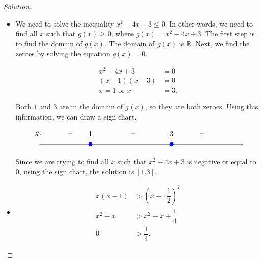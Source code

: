 \documentclass[12pt]{article}
\newenvironment{solution}{\begin{proof}[Solution]}{\end{proof}}
\begin{document}
\begin{enumerate}
\begin{solution}
\begin{itemize}
				The solution is $\left[\dfrac{1}{2},\infty\right]$.
				\item[(c)] 	We need to solve the inequality $x^2-4x+3\leq 0$. In other words, we need to find all $x$ such that $g(x) \geq 0$, where $g(x)=x^2-4x+3$. The first step is to find the domain of $g(x)$. The domain of $g(x)$ is $\mathbb{R}$. Next, we find the zeroes by solving the equation $g(x)=0$.
				
				\begin{align*}
					x^2-4x+3&=0\\
					(x-1)(x-3)&=0\\
					x=1 \text{ or } x&=3.
				\end{align*}
				
				Both $1$ and $3$ are in the domain of $g(x)$, so they are both zeroes. Using this information, we can draw a sign chart. 
				
				\[
				\begin{tikzpicture}[scale=1]
					\draw[->] (-5,0) -- (5,0);
					
					\draw (-2.5,0) node[circle,blue,fill,inner sep=2pt]{};
					\draw (1.5,0) node[circle,blue,fill,inner sep=2pt]{};
					
					\node at (-2.5, .5) {1};
					\node at (1.5, .5) {3};
					\node at (-5,.5) {$g\colon$};
					\node at (-3.5,.5) {$+$};
					\node at (-0.4,.5) {$-$};
					\node at (3, .5) {$+$};
				\end{tikzpicture}
				\]
				
				Since we are trying to find all $x$ such that $x^2-4x+3$ is negative or equal to $0$, using the sign chart, the solution is $[1.3]$.
				\item[(d)] 	\begin{align*}
					x(x-1)&>(x-1\dfrac{1}{2})^2\\
					x^2-x&>x^2-x+\dfrac{1}{4}\\
					0&>\dfrac{1}{4}.
				\end{align*}
				

\end{itemize}
\end{solution}
\end{enumerate}
\end{document}
